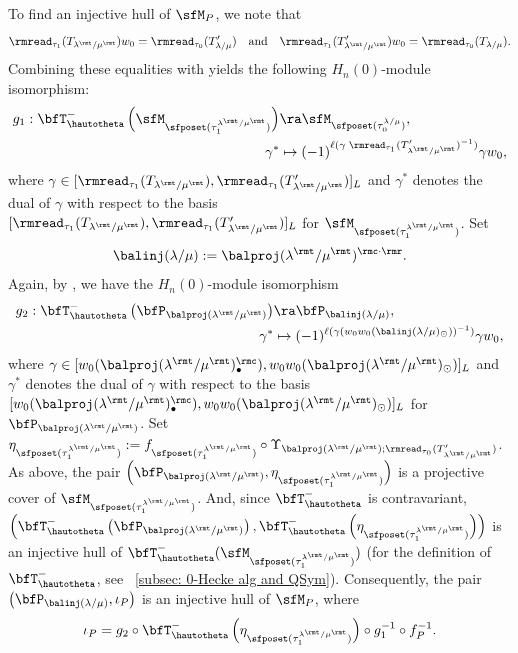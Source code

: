 \documentclass[12pt, reqno]{amsart}
\theoremstyle{definition}
\numberwithin{equation}{section} \numberwithin{figure}{section}
\numberwithin{table}{section}
\begin{document}
To find an injective hull of $\sfM_P$, we note that
\[
\rmread_{\tau_1}(T_{\lambda^\rmt/\mu^\rmt}) w_0 = \rmread_{\tau_0}(T'_{\lambda/\mu})
\quad \text{and} \quad
\rmread_{\tau_1}(T'_{\lambda^\rmt/\mu^\rmt}) w_0 = \rmread_{\tau_0}(T_{\lambda/\mu}).
\]
Combining these equalities with \cite[Theorem 4]{22JKLO} yields the following $H_n(0)$-module isomorphism:
\begin{align*}
g_1: \bfT^{-}_\hautotheta \left(
\sfM_{\sfposet(\tau_1^{\lambda^\rmt/\mu^\rmt})}\right) &\ra \sfM_{\sfposet(\tau_0^{\lambda/\mu})},
\\ 
\gamma^* &\mapsto (-1)^{\ell(\gamma \; \rmread_{\tau_1}(T'_{\lambda^\rmt/\mu^\rmt})^{-1})} \gamma w_0,
\end{align*}
where $\gamma \in [\rmread_{\tau_1}(T_{\lambda^\rmt/\mu^\rmt}), \rmread_{\tau_1}(T'_{\lambda^\rmt/\mu^\rmt})]_L$ and $\gamma^\ast$ denotes the dual of $\gamma$ with respect to the basis $[\rmread_{\tau_1}(T_{\lambda^\rmt/\mu^\rmt}), \rmread_{\tau_1}(T'_{\lambda^\rmt/\mu^\rmt})]_L$ for $\sfM_{\sfposet(\tau_1^{\lambda^\rmt/\mu^\rmt})}$.
Set
\[
\balinj(\lambda/\mu) := \balproj(\lambda^\rmt / \mu^\rmt)^{\rmc \cdot \rmr}.
\]
Again, by \cite[Theorem 4]{22JKLO}, we have the $H_n(0)$-module isomorphism 
\begin{align*}
g_2: \bfT^{-}_\hautotheta \left( \bfP_{\balproj(\lambda^\rmt / \mu^\rmt)}\right)
&\ra 
\bfP_{\balinj(\lambda/\mu)},
\\ 
\gamma^* &\mapsto (-1)^{\ell(\gamma (w_0w_0(\balinj(\lambda/\mu)_{\odot}))^{-1})} \gamma w_0,
\end{align*}
where $\gamma \in [
w_0(\balproj(\lambda^\rmt / \mu^\rmt)_{\bullet}^\rmc), w_0w_0(\balproj(\lambda^\rmt / \mu^\rmt)_{\odot})
]_L$ and $\gamma^\ast$ denotes the dual of $\gamma$ with respect to the basis $[
w_0(\balproj(\lambda^\rmt / \mu^\rmt)_{\bullet}^\rmc), w_0w_0(\balproj(\lambda^\rmt / \mu^\rmt)_{\odot})
]_L$ for $\bfP_{\balproj(\lambda^\rmt / \mu^\rmt)}$.
Set $\eta_{\sfposet(\tau_1^{\lambda^\rmt/\mu^\rmt})} := f_{\sfposet(\tau_1^{\lambda^\rmt/\mu^\rmt})} \circ \Upsilon_{\balproj(\lambda^\rmt/\mu^\rmt); \rmread_{\tau_0}(T'_{\lambda^\rmt/\mu^\rmt})}$.
As above, the pair
$\left(\bfP_{\balproj(\lambda^\rmt /\mu^\rmt)}, \eta_{\sfposet(\tau_1^{\lambda^\rmt/\mu^\rmt})}\right)$
is a projective cover of $\sfM_{\sfposet(\tau_1^{\lambda^\rmt/\mu^\rmt})}$.
And, since $\bfT^{-}_\hautotheta$ is contravariant, 
$\left( \bfT^{-}_\hautotheta \left(
\bfP_{\balproj(\lambda^\rmt /\mu^\rmt)}
\right), 
\bfT^{-}_\hautotheta 
\left(
\eta_{\sfposet(\tau_1^{\lambda^\rmt/\mu^\rmt})} 
\right)
\right)$
is an injective hull of $\bfT^{-}_\hautotheta(\sfM_{\sfposet(\tau_1^{\lambda^\rmt/\mu^\rmt})})$
(for the definition of $\bfT^{-}_\hautotheta $, see ~\cref{subsec: 0-Hecke alg and QSym}).
Consequently, the pair
$\left(\bfP_{\balinj(\lambda/\mu)}, \iota_P\right)$ is an injective hull of $\sfM_P$, where
\[
\iota_P = g_2 \circ \bfT^{-}_\hautotheta 
\left(
\eta_{\sfposet(\tau_1^{\lambda^\rmt/\mu^\rmt})} 
\right) \circ g_1^{-1} 
\circ f_P^{-1}.
\]
\end{document}
